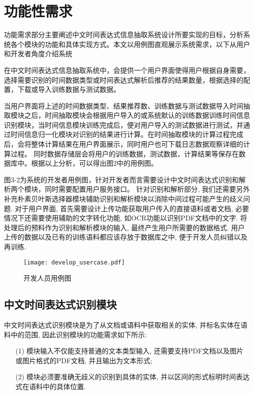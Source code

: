 \section{功能性需求}


功能需求部分主要阐述中文时间表达式信息抽取系统设计所要实现的目标，分析系统各个模块的功能和具体实现方式。本文以用例图直观展示系统需求，以下从用户和开发者角度介绍系统

在中文时间表达式信息抽取系统中，会提供一个用户界面使得用户根据自身需要，选择需要识别的时间数据类型或时间表达式解析后推荐的结果数量，根据选择的配置，下载或导入训练数据与测试数据。

当用户界面将上述的时间数据类型、结果推荐数、训练数据与测试数据导入时间抽取模块之后，时间抽取模块会根据用户导入的或系统默认的训练数据训练时间信息识别模块，当时间信息模块训练完成后，便对用户导入的测试数据进行测试，并通过时间信息归一化模块对识别的结果进行计算。在时间抽取模块的计算过程完成后，会将整体计算结果在用户界面展示，同时用户也可下载日志数据观察详细的计算过程。
同时数据存储层会将用户的训练数据，测试数据，计算结果等保存在数据库中。根据以上分析，可以得出图2中的用例图。

图3-2为系统的开发者用例图，针对开发者而言需要设计中文时间表达式识别和解析两个模块，同时需要配置用户服务接口。
针对识别和解析部分, 我们还需要另外补充朴素贝叶斯选择器模块辅助识别和解析模块以消除中间过程可能产生的歧义问题.
对于用户界面, 首先需要设计上传功能获取用户传入的直接语料或者文档, 必要情况下还需要使用辅助的文字转化功能, 如OCR功能以识别PDF文档中的文字.
将处理后的预料作为识别和解析模块的输入, 最终产生用户所需要的数据格式.
用户上传的数据以及已有的训练语料都应该存放于数据库之中, 便于开发人员纠错以及再训练.

\begin{figure}[h]
    \centering
    \texttt{[image: develop\_usercase.pdf]}
    \caption{开发人员用例图}
    \label{fig:develope_usecase}
\end{figure}

\subsection{中文时间表达式识别模块}

中文时间表达式识别模块是为了从文档或语料中获取相关的实体, 并标名实体在语料中的范围, 因此识别模块的功能需求如下所示:
\begin{enumerate}
    \item[(1)] 模块输入不仅能支持普通的文本类型输入, 还需要支持PDF文档以及图片或图片格式的PDF文档, 并且输出为文本形式;
    \item[(2)] 模块必须要准确无歧义的识别到具体的实体, 并以区间的形式标明时间表达式在语料中的具体位置.
\end{enumerate}

